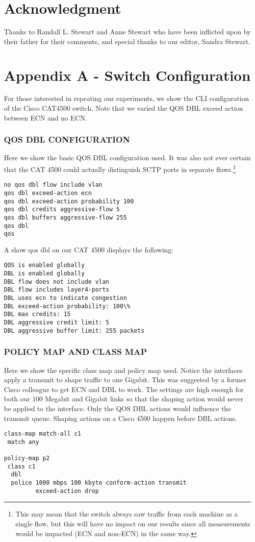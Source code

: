 \documentclass[12pt]{article}
\begin{document}
\section*{Acknowledgment}

Thanks to  Randall L. Stewart and Anne Stewart who have been inflicted upon by their father for their comments, and special thanks to our editor,  Sandra Stewart.

\section*{Appendix A - Switch Configuration}

For those interested in repeating our experiments, we show the CLI configuration of the Cisco CAT4500 switch.
Note that we varied the QOS DBL exceed action between ECN and no ECN.

\subsubsection{QOS DBL CONFIGURATION}
 
Here we show the basic QOS DBL configuration used. It was
also not ever certain that the CAT 4500 could actually distinguish SCTP ports in separate flows.\footnote{This
may mean that the switch always saw traffic from each machine as a single flow, but this will have no impact on
our results since all measurements would be impacted (ECN and non-ECN) in the same way.}
\begin{verbatim}
no qos dbl flow include vlan
qos dbl exceed-action ecn
qos dbl exceed-action probability 100
qos dbl credits aggressive-flow 5
qos dbl buffers aggressive-flow 255
qos dbl   
qos
\end{verbatim}
A show qos dbl on our CAT 4500 displays the following:
\begin{verbatim}
QOS is enabled globally
DBL is enabled globally
DBL flow does not include vlan
DBL flow includes layer4-ports
DBL uses ecn to indicate congestion
DBL exceed-action probability: 100\%
DBL max credits: 15
DBL aggressive credit limit: 5
DBL aggressive buffer limit: 255 packets
\end{verbatim}

\subsubsection {POLICY MAP AND CLASS MAP}

Here we show the specific class map and policy map used. Notice
the interfaces apply a  transmit to shape traffic to one Gigabit. This was suggested
by a former Cisco colleague to get ECN and DBL to work. The settings
are high enough for both our 100 Megabit and Gigabit links so that 
the shaping action would never be applied to the interface. Only the
QOS DBL actions would influence the transmit queue. Shaping actions
on a Cisco 4500 happen before DBL actions.
\begin{verbatim}
class-map match-all c1
 match any 

policy-map p2
 class c1 
  dbl  
  police 1000 mbps 100 kbyte conform-action transmit
         exceed-action drop 
\end{verbatim}
\end{document}
